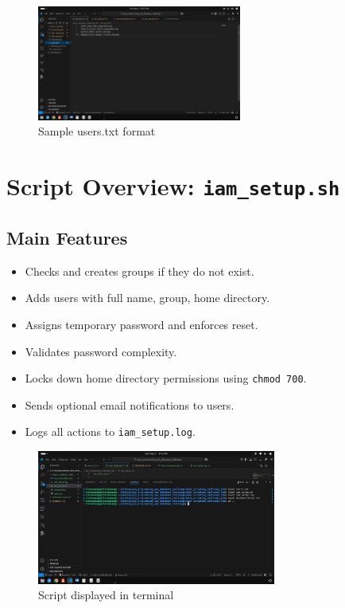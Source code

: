 \documentclass[a4paper,11pt]{article}
\begin{document}
\begin{figure}[h!]
  \centering
  \includegraphics[width=0.6\textwidth]{screenshots/users_txt_content.png}
  \caption{Sample users.txt format}
\end{figure}

\section*{Script Overview: \texttt{iam_setup.sh}}

\subsection*{Main Features}
\begin{itemize}
  \item Checks and creates groups if they do not exist.
  \item Adds users with full name, group, home directory.
  \item Assigns temporary password and enforces reset.
  \item Validates password complexity.
  \item Locks down home directory permissions using \texttt{chmod 700}.
  \item Sends optional email notifications to users.
  \item Logs all actions to \texttt{iam_setup.log}.
\end{itemize}

\begin{figure}[h!]
  \centering
  \includegraphics[width=0.7\textwidth]{screenshots/script_in_terminal.png}
  \caption{Script displayed in terminal}
\end{figure}
\end{document}

